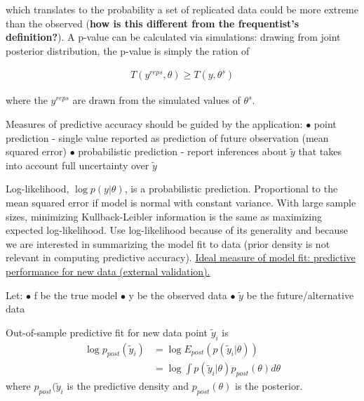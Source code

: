 \documentclass[11pt]{labbook}
\begin{document}
which translates to the probability a set of replicated data could be more extreme than the observed (\textbf{how is this different from the frequentist's definition?}). A p-value can be calculated via simulations: drawing from joint posterior distribution, the p-value is simply the ration of

\begin{align*}
T(y^{rep s},\theta) \geq T(y,\theta^s)
\end{align*}

where the $y^{rep s}$ are drawn from the simulated values of $\theta^s$.


Measures of predictive accuracy should be guided by the application:
$\bullet$ point prediction - single value reported as prediction of future observation (mean squared error)
\newline
$\bullet$ probabilistic prediction - report inferences about $\tilde{y}$ that takes into account full uncertainty over $\tilde{y}$
\newline

Log-likelihood, $\log{p(y|\theta)}$, is a probabilistic prediction. Proportional to the mean squared error if model is normal with constant variance. With large sample sizes, minimizing Kullback-Leibler information is the same as maximizing expected log-likelihood. Use log-likelihood because of its generality and because we are interested in summarizing the model fit to data (prior density is not relevant in computing predictive accuracy). 
\newline
\newline
\underline{Ideal measure of model fit: predictive performance for new data (external validation).} 
\newline

Let:\newline
$\bullet$ f be the true model \newline
$\bullet$ y be the observed data \newline
$\bullet$ $\tilde{y}$ be the future/alternative data

Out-of-sample predictive fit for new data point $\tilde{y}_i$ is
\begin{align*}
\log{p_{post}(\tilde{y}_i)} &= \log{E_{post}(p(\tilde{y}_i|\theta))}\\
&= \log{\int p(\tilde{y}_i|\theta)p_{post}(\theta)d\theta}
\end{align*}
where $p_{post}(\tilde{y}_i$ is the predictive density and $p_{post}(\theta)$ is the posterior. 
\end{document}
